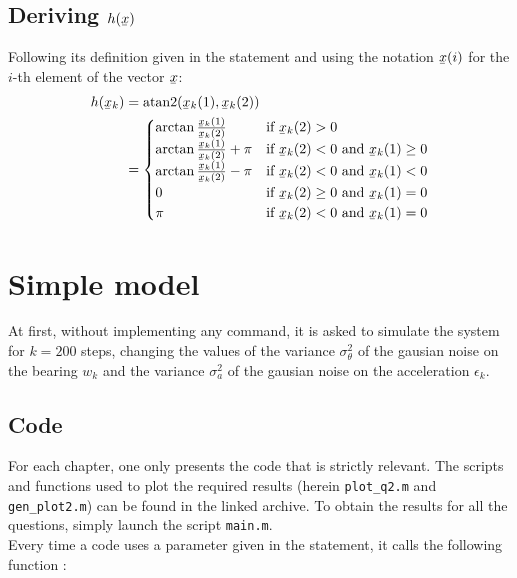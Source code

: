 \documentclass[english,DIV=13]{scrreprt}
\newcommand{\ubar}[1]{\underaccent{\bar}{#1}}
\newcommand{\uvec}[1]{\ubar{#1}}
\begin{document}
\section*{Deriving $h(\ubar{x})$}
Following its definition given in the statement and using the notation $\uvec{x}(i)$
for the $i$-th element of the vector $\uvec{x}$:
\begin{align*}
    h(\uvec{x}_k) &= \mathrm{atan2}(\uvec{x}_k(1), \uvec{x}_k(2)) \\
    &= \begin{cases}
        \arctan\frac{\uvec{x}_k(1)}{\uvec{x}_k(2)} & \text{if $\uvec{x}_k(2) > 0$} \\
        \arctan\frac{\uvec{x}_k(1)}{\uvec{x}_k(2)}+\pi & \text{if $\uvec{x}_k(2) < 0$ and $\uvec{x}_k(1) \geq 0$} \\
        \arctan\frac{\uvec{x}_k(1)}{\uvec{x}_k(2)}-\pi & \text{if $\uvec{x}_k(2) < 0$ and $\uvec{x}_k(1) < 0$} \\
        0 & \text{if $\uvec{x}_k(2) \geq 0$ and $\uvec{x}_k(1) = 0$} \\
        \pi & \text{if $\uvec{x}_k(2) < 0$ and $\uvec{x}_k(1) = 0$}
    \end{cases}
\end{align*}

\chapter{Simple model}
At first, without implementing any command, it is asked to simulate the system for $k=200$ steps, changing
the values of the variance $\sigma^2_{\theta}$ of the gausian noise on the bearing $w_k$  and
the variance  $\sigma^2_a$ of the gausian noise on the acceleration $\epsilon_k$.

\section*{Code}
For each chapter, one only presents the code that is strictly relevant. The scripts and functions 
used to plot the required results (herein \texttt{plot\_q2.m} and \texttt{gen\_plot2.m})
can be found in the linked archive. To obtain the results for all the questions, simply launch
the script \texttt{main.m}.\\



Every time a code uses a parameter given in the statement, it calls the following function : 

\end{document}

